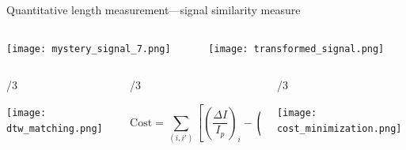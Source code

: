 
\begin{frame}[c]{Quantitative length measurement---signal similarity measure}
	\vspace{-.1in}
	\begin{columns}[t]
	
		\begin{column}[T]{2.25in}
			{\centering
				\texttt{[image: mystery\_signal\_7.png]} \\
				\par
			}
		\end{column}
		
		\begin{column}[T]{2.25in}
			{\centering
				\texttt{[image: transformed\_signal.png]} \\
				\par
			}
		\end{column}

	\end{columns}

	\vspace{.2in}	
	
	\begin{columns}[t]
	
		\begin{column}[T]{\paperwidth/3}
			{\centering
				\texttt{[image: dtw\_matching.png]} \\
				\par
			}
		\end{column}
		
		\begin{column}[T]{\paperwidth/3}
			{\centering
				\vspace{.2in}
				{\scriptsize \[\mathrm{Cost}=\sum_{\left(i,i'\right)}\left[\left(\frac{\Delta I}{I_{p}}\right)_{i}-\left(\frac{\Delta I}{I_{p}}\right)_{i'}\right] \] } \\
				\par
			}
		\end{column}
		
		\begin{column}[T]{\paperwidth/3}
			{\centering
				\texttt{[image: cost\_minimization.png]} \\
				\par
			}
		\end{column}


\end{columns}
\end{frame}
